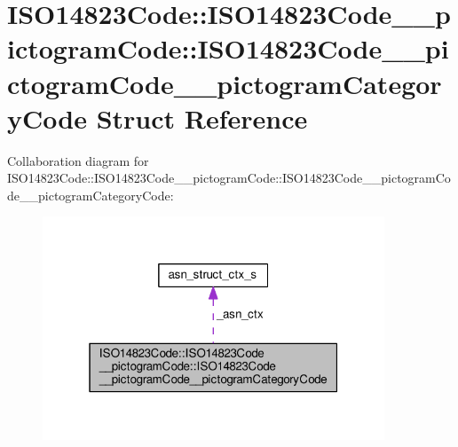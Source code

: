 \hypertarget{structISO14823Code_1_1ISO14823Code____pictogramCode_1_1ISO14823Code____pictogramCode____pictogramCategoryCode}{}\section{I\+S\+O14823\+Code\+:\+:I\+S\+O14823\+Code\+\_\+\+\_\+pictogram\+Code\+:\+:I\+S\+O14823\+Code\+\_\+\+\_\+pictogram\+Code\+\_\+\+\_\+pictogram\+Category\+Code Struct Reference}
\label{structISO14823Code_1_1ISO14823Code____pictogramCode_1_1ISO14823Code____pictogramCode____pictogramCategoryCode}


Collaboration diagram for I\+S\+O14823\+Code\+:\+:I\+S\+O14823\+Code\+\_\+\+\_\+pictogram\+Code\+:\+:I\+S\+O14823\+Code\+\_\+\+\_\+pictogram\+Code\+\_\+\+\_\+pictogram\+Category\+Code\+:\nopagebreak
\begin{figure}[H]
\begin{center}
\leavevmode
\includegraphics[width=289pt]{structISO14823Code_1_1ISO14823Code____pictogramCode_1_1ISO14823Code____pictogramCode____pictogramCategoryCode__coll__graph}
\end{center}
\end{figure}
